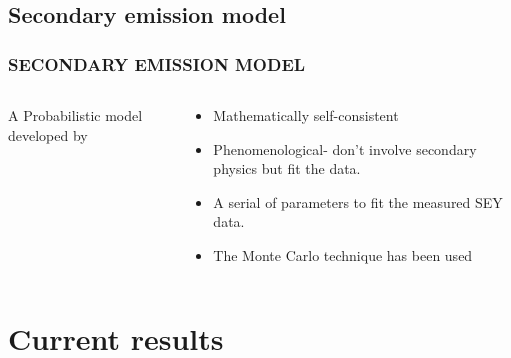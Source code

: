 \documentclass{beamer}
\begin{document}
\subsection{Secondary emission model}
\begin{frame}
\frametitle{SECONDARY EMISSION MODEL}
\begin{columns}
\begin{column}[t]{6.5cm}
\begin{figure}[H]
\begin{center}


\end{center}
\end{figure}

A Probabilistic model developed by \cite{SE}
\end{column}
\pause
\begin{column}[t]{5cm}
\begin{itemize}
\item Mathematically self-consistent
\pause
\item Phenomenological- don't involve secondary physics but fit the data.
\pause

\item A serial of parameters to fit the measured SEY data.
\pause
\item The Monte Carlo technique has been used

\end{itemize}
\end{column}
\end{columns}
\end{frame}
\section{Current results}
\end{document}
